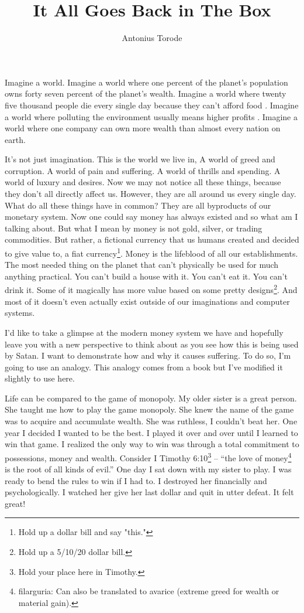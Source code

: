 \documentclass[11pt]{article}
\title{It All Goes Back in The Box}
\author{Antonius Torode}
\begin{document}
\maketitle
\thispagestyle{fancy}

\begin{multicols}{2}
Imagine a world. Imagine a world where one percent of the planet's population owns forty seven percent of the planet's wealth\cite{Suisse}. Imagine a world where twenty five thousand people die every single day because they can't afford food \cite{UN}. Imagine a world where polluting the environment usually means higher profits \cite{pollution}. Imagine a world where one company can own more wealth than almost every nation on earth.

It’s not just imagination. This is the world we live in, A world of greed and corruption. A world of pain and suffering. A world of thrills and spending. A world of luxury and desires. Now we may not notice all these things, because they don’t all directly affect us. However, they are all around us every single day. What do all these things have in common? They are all byproducts of our monetary system. Now one could say money has always existed and so what am I talking about. But what I mean by money is not gold, silver, or trading commodities. But rather, a fictional currency that us humans created and decided to give value to, a fiat currency\footnote{Hold up a dollar bill and say "this."}. Money is the lifeblood of all our establishments. The most needed thing on the planet that can't physically be used for much anything practical. You can’t build a house with it. You can’t eat it. You can’t drink it. Some of it magically has more value based on some pretty designs\footnote{Hold up a 5/10/20 dollar bill.}. And most of it doesn't even actually exist outside of our imaginations and computer systems.

I’d like to take a glimpse at the modern money system we have and hopefully leave you with a new perspective to think about as you see how this is being used by Satan. I want to demonstrate how and why it causes suffering. To do so, I’m going to use an analogy. This analogy comes from a book but I've modified it slightly to use here.

Life can be compared to the game of monopoly. My older sister is a great person. She taught me how to play the game monopoly. She knew the name of the game was to acquire and accumulate wealth. She was ruthless, I couldn't beat her. One year I decided I wanted to be the best. I played it over and over until I learned to win that game. I realized the only way to win was through a total commitment to possessions, money and wealth. Consider I Timothy 6:10\footnote{Hold your place here in Timothy.} – ``the love of money\footnote{filarguria: Can also be translated to avarice (extreme greed for wealth or material gain).} is the root of all kinds of evil.” One day I sat down with my sister to play. I was ready to bend the rules to win if I had to. I destroyed her financially and psychologically. I watched her give her last dollar and quit in utter defeat. It felt great!


\end{multicols}
\end{document}
